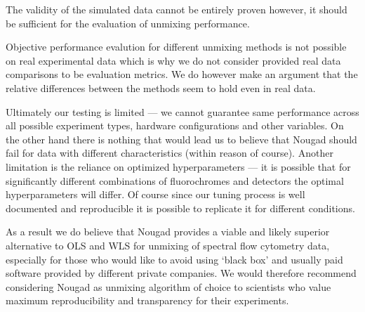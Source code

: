 The validity of the simulated data cannot be entirely proven however, it should be sufficient for the evaluation of unmixing performance.

Objective performance evalution for different unmixing methods is not possible on real experimental data which is why we do not consider provided real data comparisons to be evaluation metrics. We do however make an argument that the relative differences between the methods seem to hold even in real data.

Ultimately our testing is limited --- we cannot guarantee same performance across all possible experiment types, hardware configurations and other variables. On the other hand there is nothing that would lead us to believe that Nougad should fail for data with different characteristics (within reason of course). Another limitation is the reliance on optimized hyperparameters --- it is possible that for significantly different combinations of fluorochromes and detectors the optimal hyperparameters will differ. Of course since our tuning process is well documented and reproducible it is possible to replicate it for different conditions. 

As a result we do believe that Nougad provides a viable and likely superior alternative to OLS and WLS for unmixing of spectral flow cytometry data, especially for those who would like to avoid using `black box' and usually paid software provided by different private companies. We would therefore recommend considering Nougad as unmixing algorithm of choice to scientists who value maximum reproducibility and transparency for their experiments.